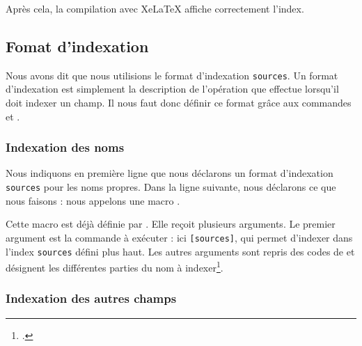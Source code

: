 Après cela, la compilation avec XeLaTeX affiche correctement l'index.

\subsection{Fomat d'indexation }

Nous avons dit que nous utilisions le format d'indexation \verb|sources|. Un format d'indexation   est simplement la description de l'opération que  effectue lorsqu'il doit indexer un champ. 
Il nous faut donc définir ce format grâce aux commandes  et .

\subsubsection{Indexation des noms}

\begin{english}
\begin{latexcode}
\end{latexcode}
\end{english}

Nous indiquons en première ligne que nous déclarons un format d'indexation \verb|sources| pour les noms propres. Dans la ligne suivante, nous déclarons ce que nous faisons : nous appelons une macro . 

Cette macro est déjà définie par . Elle reçoit plusieurs arguments. Le premier argument est la commande à exécuter : ici \verb|[sources]|, qui permet d'indexer dans l'index \verb|sources| défini plus haut. Les autres arguments sont repris des codes de  et désignent les différentes parties du nom à indexer\footcite[Nous renvoyons le lecteur à la documentation de  : ][]{biblatex_formats}.


\subsubsection{Indexation des autres champs}

\begin{latexcode}
\end{latexcode}

